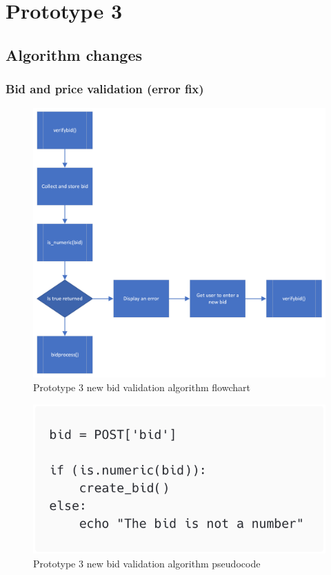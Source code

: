 \section{Prototype 3}
\subsection{Algorithm changes}
\subsubsection{Bid and price validation (error fix)}
\begin{figure}[H]
    \centering
    \includegraphics[scale=0.4]{ch3_developing/proto3/flow_bid.png}
    \caption{Prototype 3 new bid validation algorithm flowchart}
    \label{fig:proto3_flowbid}
\end{figure}
 \begin{figure}[H]
     \centering
     \includegraphics[scale=0.4]{ch3_developing/proto3/bid_integer.png}
     \caption{Prototype 3 new bid validation algorithm pseudocode}
     \label{fig:proto3_bidinteger}
 \end{figure}
